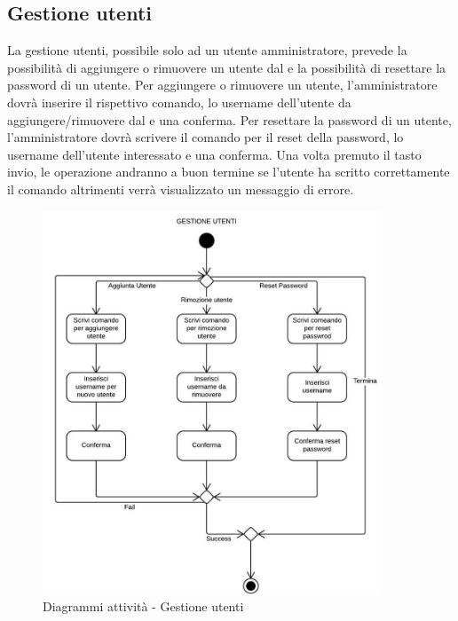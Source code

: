 \documentclass{scalatekids-article}
\begin{document}
\subsection{Gestione utenti}

La gestione utenti, possibile solo ad un utente amministratore, prevede la
possibilità di aggiungere o rimuovere un utente dal  e la possibilità
di resettare la password di un utente. Per aggiungere o rimuovere un utente,
l'amministratore dovrà inserire il rispettivo comando, lo username dell'utente
da aggiungere/rimuovere dal  e una conferma. Per resettare la password
di un utente, l'amministratore dovrà scrivere il comando per il reset della
password, lo username dell'utente interessato e una conferma. Una volta
premuto il tasto invio, le operazione andranno a buon termine se l'utente ha
scritto correttamente il comando altrimenti verrà visualizzato un messaggio di
errore.

\begin{figure}[H]
  \begin{center}
    \includegraphics[width=0.9\textwidth, keepaspectratio]{img/diagrammiAttivita/gestioneUtenti.jpeg}
    \caption{Diagrammi attività - Gestione utenti}
  \end{center}
\end{figure}
\end{document}
